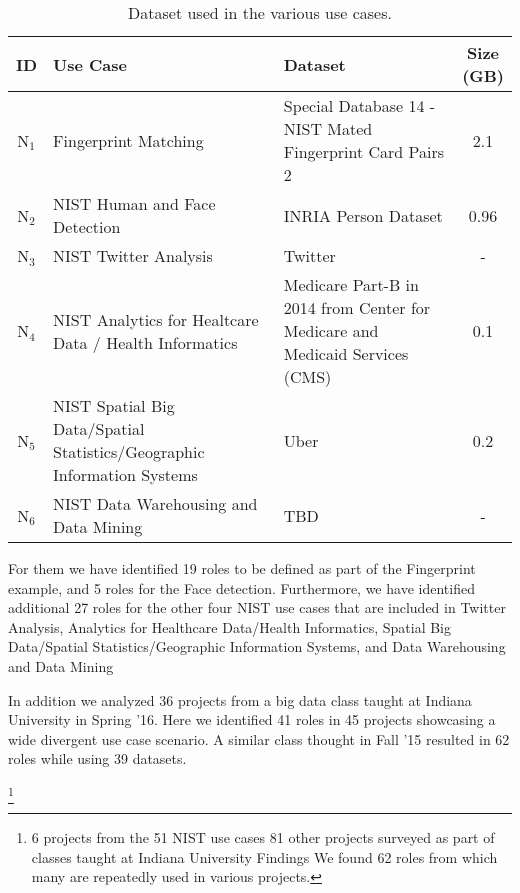 \begin{table}[htb]
\begin{small}
\begin{center}
{\begin{tabular}{|c|*{25}c|}
        \end{tabular}
      }
    \end{center}
  \end{small}
\end{table}


\begin{table*}[htb]
  \caption{Dataset used in the various use cases.}
  \bigskip
  \label{T:usecase2}
  \begin{center}
    \begin{tabular}{|c|p{}|p{}|c|}

      \hline

      ID & Use Case & Dataset & \shortstack{Size\\(GB)} \tabularnewline \hline
      N$_1$ & Fingerprint Matching & Special Database 14 - NIST Mated Fingerprint Card Pairs 2 & 2.1 \tabularnewline \hline
      N$_2$ & NIST Human and Face Detection & INRIA Person Dataset & 0.96 \tabularnewline \hline
      N$_3$ & NIST Twitter Analysis & Twitter & - \tabularnewline \hline
      N$_4$ & NIST Analytics for Healtcare Data / Health Informatics & Medicare Part-B in 2014 from Center for Medicare and Medicaid Services (CMS) & 0.1 \tabularnewline \hline
      N$_5$ & NIST Spatial Big Data/Spatial Statistics/Geographic Information Systems & Uber & 0.2 \tabularnewline \hline
      N$_6$ & NIST Data Warehousing and Data Mining & TBD & - \tabularnewline \hline

    \end{tabular}
  \end{center}
\end{table*}




For them we have identified 19 roles to be defined as part of the
Fingerprint example, and 5 roles for the Face detection. Furthermore,
we have identified additional 27 roles for the other four NIST use
cases that are included in Twitter Analysis, Analytics for Healthcare
Data/Health Informatics, Spatial Big Data/Spatial
Statistics/Geographic Information Systems, and Data Warehousing and
Data Mining

In addition we analyzed 36 projects from a big data class taught at
Indiana University in Spring '16. Here we identified 41 roles in 45
projects showcasing a wide divergent use case scenario.  A similar
class thought in Fall '15 resulted in 62 roles while using 39
datasets.


\footnote{6 projects from the 51 NIST use cases
81 other projects surveyed as part of classes taught at Indiana University
Findings
We found 62 roles from which many are repeatedly used in various projects. 
}




